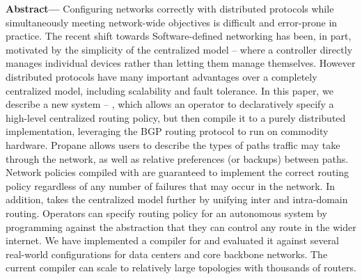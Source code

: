 \textbf{Abstract---}
Configuring networks correctly with distributed protocols while simultaneously meeting network-wide objectives is difficult and error-prone in practice.
The recent shift towards Software-defined networking has been, in part, motivated by the simplicity of the centralized model -- where a controller directly manages individual devices rather than letting them manage themselves. However distributed protocols have many important advantages over a completely centralized model, including scalability and fault tolerance.
%
In this paper, we describe a new system -- \sysname, which allows an operator to declaratively specify a high-level centralized routing policy, but then compile it to a purely distributed implementation, leveraging the BGP routing protocol to run on commodity hardware. 
%
Propane allows users to describe the types of paths traffic may take through the network, as well as relative preferences (or backups) between paths. 
%
Network policies compiled with \sysname are guaranteed to implement the correct routing policy regardless of any number of failures that may occur in the network. 
%
In addition, \sysname takes the centralized model further by unifying inter and intra-domain routing. Operators can specify routing policy for an autonomous system by programming against the abstraction that they can control any route in the wider internet.
%
We have implemented a compiler for \sysname and evaluated it against several real-world configurations for data centers and core backbone networks. The current \sysname compiler can scale to relatively large topologies with thousands of routers.